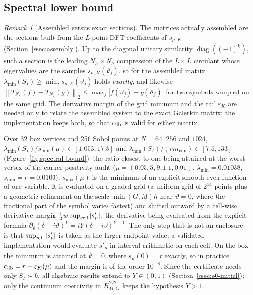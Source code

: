 \documentclass[11pt]{amsart}
\theoremstyle{remark}
\newtheorem{remark}[theorem]{Remark}
\newcommand{\norm}[1]{\left\lVert #1\right\rVert}
\newcommand{\rf}{r}
\newcommand{\Tn}[2]{T_{#1}(#2)}          %
\newcommand{\sym}[1]{#1}                 %
\newcommand{\smin}{s_{\min}}
\begin{document}
\subsection{Spectral lower bound}
\label{ssec:spectral}


\begin{remark}[Assembled versus exact sections]\label{rem:compression}
The matrices actually assembled are the sections built from the $L$-point DFT coefficients of
$\sym{s}_{\mu,K}$ (Section~\ref{ssec:assembly}).  Up to the diagonal unitary similarity
$\operatorname{diag}((-1)^k)$, such a section is the leading $N_h\times N_h$ compression of the
$L\times L$ circulant whose eigenvalues are the samples $\sym{s}_{\mu,K}(\vartheta_j)$, so for the
assembled matrix $\lambda_{\min}(S_I)\ge\min_j\sym{s}_{\mu,K}(\vartheta_j)$ holds \emph{exactly},
and likewise $\norm{\Tn{N_h}{f}-\Tn{N_h}{g}}_2\le\max_j|f(\vartheta_j)-g(\vartheta_j)|$ for two
symbols sampled on the same grid.  The derivative margin of the grid minimum and the tail
$\varepsilon_K$ are needed only to relate the assembled system to the exact Galerkin matrix; the
implementation keeps both, so that $\alpha_{\rm lb}$ is valid for either matrix.
\end{remark}
Over 32 box vertices and 256 Sobol points at $N=64$, $256$ and $1024$,
$\lambda_{\min}(S_I)/\smin(\mu)\in[1.003,17.8]$ and $\lambda_{\min}(S_I)/(\rf m_{\min})\in[7.5,133]$
(Figure~\ref{fig:spectral-bound}), the ratio closest to one being attained at the worst vertex of
the earlier positivity audit ($\mu=(0.05,5,9,1.1,0.01)$, $\lambda_{\min}=0.01038$, $\smin=\rf=0.0100$).
$\smin(\mu)$ is the minimum of an explicit smooth even function of one variable.  It is
evaluated on a graded grid (a uniform grid of $2^{14}$ points plus a geometric refinement on the
scale $\min(G,M)h$ near $\vartheta=0$, where the fractional part of the symbol varies fastest)
and shifted outward by a cell-wise derivative margin $\tfrac12 w\,\sup_{\rm cell}|\sym{s}'_{\mu}|$, the
derivative being evaluated from the explicit formula
$\partial_\vartheta(\delta+i\vartheta)^Y=iY(\delta+i\vartheta)^{Y-1}$.  The only step that is not an
enclosure is that $\sup_{\rm cell}|\sym{s}'_\mu|$ is taken as the larger endpoint value; a validated
implementation would evaluate $\sym{s}'_\mu$ in interval arithmetic on each cell.  On the box the
minimum is attained at $\vartheta=0$, where $\sym{s}_\mu(0)=\rf$ exactly, so in practice
$\alpha_{\rm lb}=\rf-\varepsilon_K(\mu)$ and the margin is of the order $10^{-8}$.
Since the certificate needs only $S_I\succ0$, all algebraic results extend to $Y\in(0,1)$
(Section~\ref{ssec:e0-initial}); only the continuum coercivity in $H^{Y/2}_{M,G}$ keeps the
hypothesis $Y>1$.
\end{document}
